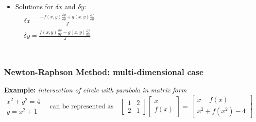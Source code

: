 \begin{frame}[fragile]
\begin{columns}
\begin{itemize}
      \item Solutions for \(\delta x\) and \(\delta y\):
      \begin{align*}
          &\delta x = \frac{-f(x, y) \frac{\partial g}{\partial y} + g(x, y) \frac{\partial f}{\partial y}}{J}\\
          &\delta y = \frac{f(x, y) \frac{\partial g}{\partial x} - g(x, y) \frac{\partial f}{\partial x}}{J}
      \end{align*}
    \end{itemize}
  \end{columns}
\end{frame}


\begin{frame}[fragile]
    \frametitle{Newton-Raphson Method: multi-dimensional case}
    \textbf{Example: }
    \textit{intersection of circle with parabola in matrix form}
    \[
    \begin{array}{c}
    x^2 + y^2 = 4 \\
    y = x^2 + 1
    \end{array}
    \quad \text{can be represented as} \quad
    \begin{bmatrix}
    1 & 2 \\
    2 & 1
    \end{bmatrix}
    \begin{bmatrix}
    x \\
    f(x)
    \end{bmatrix}
    = 
    \begin{bmatrix}
    x - f(x) \\
    x^2 + f(x^2) - 4
    \end{bmatrix}
    \]
  

\end{frame}
